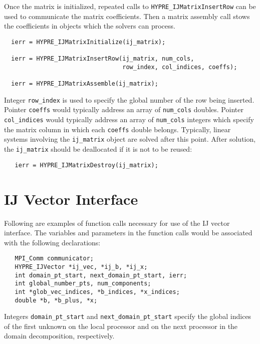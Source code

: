 Once the matrix is initialized, repeated calls to
\verb+HYPRE_IJMatrixInsertRow+ can be used to communicate
the matrix coefficients.  Then a matrix assembly call stows
the coefficients in objects which the solvers can process. 

\begin{verbatim}
  ierr = HYPRE_IJMatrixInitialize(ij_matrix);

  ierr = HYPRE_IJMatrixInsertRow(ij_matrix, num_cols,
                                 row_index, col_indices, coeffs);

  ierr = HYPRE_IJMatrixAssemble(ij_matrix);
\end{verbatim}

\noindent Integer \verb+row_index+ is used to specify the global
number of the row being inserted.
\noindent Pointer \verb+coeffs+ would typically address an array of
\verb+num_cols+ doubles.
Pointer \verb+col_indices+ would typically
address an array of \verb+num_cols+ integers which specify the
matrix column in which each \verb+coeffs+ double belongs.  
Typically, linear systems involving the \verb+ij_matrix+
object are solved after this point.  After solution, the
\verb+ij_matrix+ should be deallocated if it is not to be reused:

\begin{verbatim}
   ierr = HYPRE_IJMatrixDestroy(ij_matrix);
\end{verbatim}

\section{IJ Vector Interface}

Following are examples of function calls necessary for use of the
IJ vector interface.  The variables and parameters in the
function calls would be associated with the following declarations:

\begin{verbatim}
   MPI_Comm communicator;
   HYPRE_IJVector *ij_vec, *ij_b, *ij_x;
   int domain_pt_start, next_domain_pt_start, ierr;
   int global_number_pts, num_components;
   int *glob_vec_indices, *b_indices, *x_indices;
   double *b, *b_plus, *x;
\end{verbatim}

\noindent Integers \verb+domain_pt_start+ and \verb+next_domain_pt_start+
specify the global indices of the first unknown on the local processor
and on the next processor in the domain decomposition, respectively.

